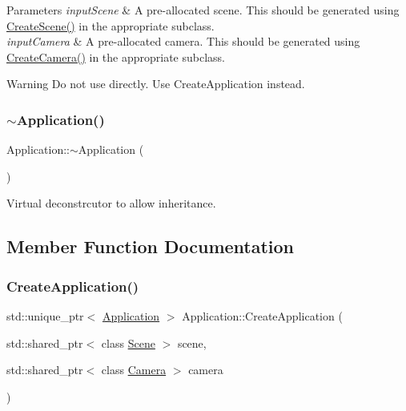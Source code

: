 \begin{DoxyParams}{Parameters}
{\em input\+Scene} & A pre-\/allocated scene. This should be generated using \hyperlink{class_application_a511e638cf5748e10151f17d6140b9119}{Create\+Scene()} in the appropriate subclass. \\
\hline
{\em input\+Camera} & A pre-\/allocated camera. This should be generated using \hyperlink{class_application_a53c0a539fd2c4fe2cc48143cc0a3ea24}{Create\+Camera()} in the appropriate subclass. \\
\hline
\end{DoxyParams}
\begin{DoxyWarning}{Warning}
Do not use directly. Use Create\+Application instead.
\end{DoxyWarning}
\hypertarget{class_application_a748bca84fefb9c12661cfaa2f623748d}{}\label{class_application_a748bca84fefb9c12661cfaa2f623748d}
\subsubsection{\texorpdfstring{$\sim$\+Application()}{~Application()}}
{\footnotesize\ttfamily Application\+::$\sim$\+Application (\begin{DoxyParamCaption}{ }\end{DoxyParamCaption})\hspace{0.3cm}{\ttfamily [virtual]}}



Virtual deconstrcutor to allow inheritance.



\subsection{Member Function Documentation}
\hypertarget{class_application_a727f63f898a68bddf6d88309195ef194}{}\label{class_application_a727f63f898a68bddf6d88309195ef194}
\subsubsection{\texorpdfstring{Create\+Application()}{CreateApplication()}}
{\footnotesize\ttfamily std\+::unique\+\_\+ptr$<$ \hyperlink{class_application}{Application} $>$ Application\+::\+Create\+Application (\begin{DoxyParamCaption}\item[{std\+::shared\+\_\+ptr$<$ class \hyperlink{class_scene}{Scene} $>$}]{scene,  }\item[{std\+::shared\+\_\+ptr$<$ class \hyperlink{class_camera}{Camera} $>$}]{camera }\end{DoxyParamCaption})\hspace{0.3cm}{\ttfamily [static]}}



